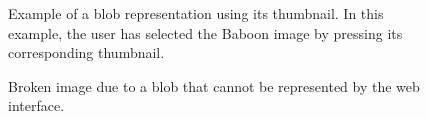 \begin{figure}[h]
\centering
{}
\caption{Example of a blob representation using its thumbnail. In this example, the user has selected the Baboon image by pressing its corresponding thumbnail.} 
\label{fig:blob_thumbnail_example}
\end{figure}
%
\begin{figure}[h]
\centering
{}
\caption{Broken image due to a blob that cannot be represented by the web interface.} 
\label{fig:broken_representation}
\end{figure}

